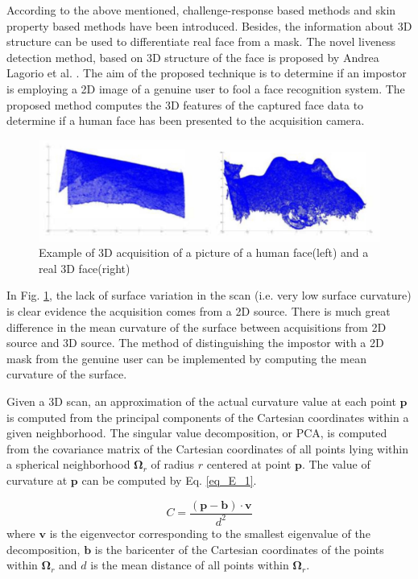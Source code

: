 \documentclass[journal]{IEEEtran}
\begin{document}
According to the above mentioned, challenge-response based methods and skin property based methods have been introduced. Besides, the information about 3D structure can be used to differentiate real face from a mask. The novel liveness detection method, based on 3D structure of the face is proposed by Andrea Lagorio et al. \cite{lagorio2013liveness}. The aim of the proposed technique is to determine if an impostor is employing a 2D image of a genuine user to fool a face recognition system. The proposed method computes the 3D features of the captured face data to determine if a human face has been presented to the acquisition camera.

\begin{figure}[!t]
\centering
\includegraphics[width=1\linewidth]{img/E_1}
\caption{Example of 3D acquisition of a picture of a human face(left) and a real 3D face(right)}
\label{fig_E_1}
\end{figure}

In Fig. \ref{fig_E_1}, the lack of surface variation in the scan (i.e. very low surface curvature) is clear evidence the acquisition comes from a 2D source. There is much great difference in the mean curvature of the surface between acquisitions from 2D source and 3D source. The method of distinguishing the impostor with a 2D mask from the genuine user can be implemented by computing the mean curvature of the surface.

Given a 3D scan, an approximation of the actual curvature value at each point $\mathbf{p}$ is computed from the principal components of the Cartesian coordinates within a given neighborhood. The singular value decomposition, or PCA, is computed from the covariance matrix of the Cartesian coordinates of all points lying within a spherical neighborhood $\mathbf{\Omega}_r$ of radius $r$ centered at point $\mathbf{p}$. The value of curvature at $\mathbf{p}$ can be computed by Eq. \ref{eq_E_1}.

\begin{equation}
\label{eq_E_1}
C = \frac{\mathbf{(p-b)\cdot v}}{d^2}
\end{equation}
where $\mathbf{v}$ is the eigenvector corresponding to the smallest eigenvalue of the decomposition, $\mathbf{b}$ is the baricenter of the Cartesian coordinates of the points within $\mathbf{\Omega}_r$ and $d$ is the mean distance of all points within $\mathbf{\Omega}_r$.
\end{document}
